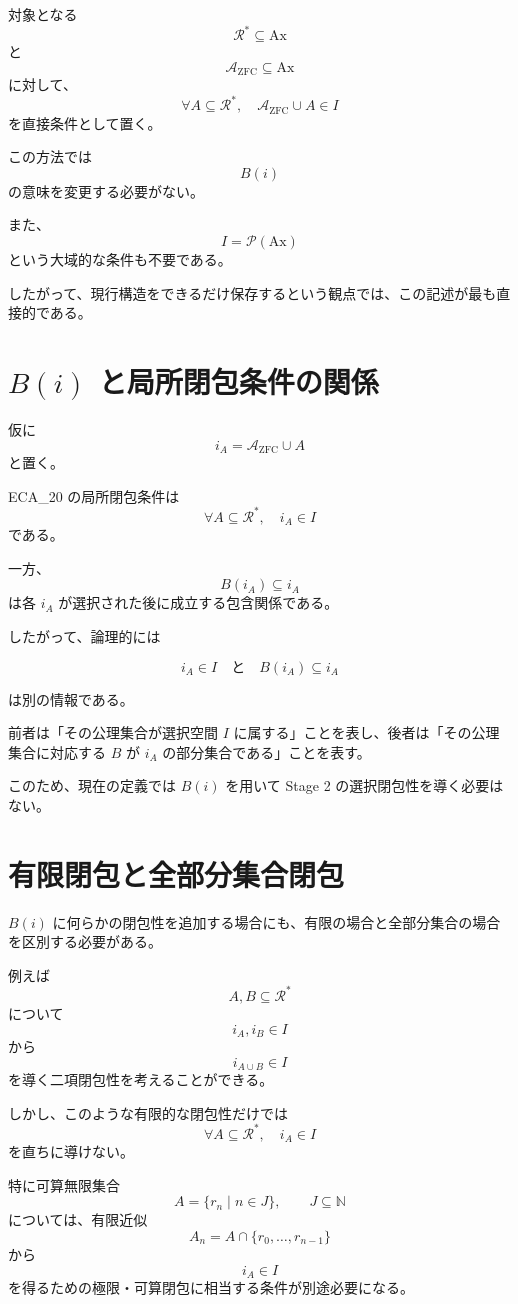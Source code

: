 \documentclass[a4paper,11pt]{article}
\newcommand{\Ax}{\mathrm{Ax}}
\begin{document}
対象となる
\[
\mathcal{R}^*\subseteq\Ax
\]
と
\[
\mathcal{A}_{\mathrm{ZFC}}\subseteq\Ax
\]
に対して、
\[
\boxed{
\forall A\subseteq\mathcal{R}^*,
\quad
\mathcal{A}_{\mathrm{ZFC}}\cup A\in I
}
\]
を直接条件として置く。

この方法では
\[
B(i)
\]
の意味を変更する必要がない。

また、
\[
I=\mathcal{P}(\Ax)
\]
という大域的な条件も不要である。

したがって、現行構造をできるだけ保存するという観点では、この記述が最も直接的である。

\section{$B(i)$ と局所閉包条件の関係}

仮に
\[
i_A=\mathcal{A}_{\mathrm{ZFC}}\cup A
\]
と置く。

ECA_20 の局所閉包条件は
\[
\forall A\subseteq\mathcal{R}^*,
\quad i_A\in I
\]
である。

一方、
\[
B(i_A)\subseteq i_A
\]
は各 $i_A$ が選択された後に成立する包含関係である。

したがって、論理的には

\[
\boxed{
i_A\in I
\quad\text{と}\quad
B(i_A)\subseteq i_A
}
\]

は別の情報である。

前者は「その公理集合が選択空間 $I$ に属する」ことを表し、後者は「その公理集合に対応する $B$ が $i_A$ の部分集合である」ことを表す。

このため、現在の定義では $B(i)$ を用いて Stage 2 の選択閉包性を導く必要はない。

\section{有限閉包と全部分集合閉包}

$B(i)$ に何らかの閉包性を追加する場合にも、有限の場合と全部分集合の場合を区別する必要がある。

例えば
\[
A,B\subseteq\mathcal{R}^*
\]
について
\[
i_A,i_B\in I
\]
から
\[
i_{A\cup B}\in I
\]
を導く二項閉包性を考えることができる。

しかし、このような有限的な閉包性だけでは
\[
\forall A\subseteq\mathcal{R}^*,
\quad i_A\in I
\]
を直ちに導けない。

特に可算無限集合
\[
A=\{r_n\mid n\in J\},
\qquad J\subseteq\mathbb{N}
\]
については、有限近似
\[
A_n=A\cap\{r_0,\ldots,r_{n-1}\}
\]
から
\[
i_A\in I
\]
を得るための極限・可算閉包に相当する条件が別途必要になる。
\end{document}
